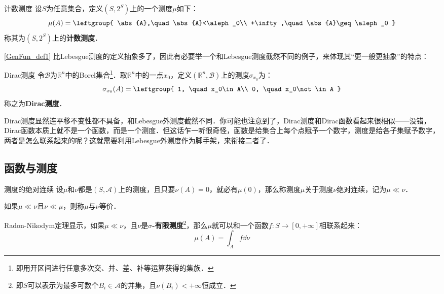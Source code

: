 \begin{example}{计数测度}
设$S$为任意集合，定义$(S, 2^S)$上的一个测度$\mu$如下：
\begin{equation}
\mu(A)=
\leftgroup{
    \abs{A},\quad \abs{A}<\aleph_0\\
    +\infty,\quad \abs{A}\geq\aleph_0
}
\end{equation}
称其为$(S, 2^S)$上的\textbf{计数测度}．
\end{example}

\autoref{GenFun_def1} 比Lebesgue测度的定义抽象多了，因此有必要举一个和Lebesgue测度截然不同的例子，来体现其“更一般更抽象”的特点：

\begin{example}{Dirac测度}
令$\mathcal{B}$为$\mathbb{R}^n$中的Borel集合\footnote{即用开区间进行任意多次交、并、差、补等运算获得的集族．}．取$\mathbb{R}^n$中的一点$x_0$，定义$(\mathbb{R}^n, \mathcal{B})$上的测度$\sigma_{x_0}$为：
\begin{equation}
\sigma_{x_0}(A)=\leftgroup{
    1, \quad x_0\in A\\
    0, \quad x_0\not\in A
}
\end{equation}
称之为\textbf{Dirac测度}．
\end{example}

Dirac测度显然连平移不变性都不具备，和Lebesgue外测度截然不同．你可能也注意到了，Dirac测度和Dirac函数看起来很相似——没错，Dirac函数本质上就不是一个函数，而是一个测度．但这话乍一听很奇怪，函数是给集合上每个点赋予一个数字，测度是给各子集赋予数字，两者是怎么联系起来的呢？这就需要利用Lebesgue外测度作为脚手架，来衔接二者了．





\subsection{函数与测度}




\begin{definition}{测度的绝对连续}
设$\mu$和$\nu$都是$(S, \mathcal{A})$上的测度，且只要$\nu(A)=0$，就必有$\mu(0)$，那么称测度$\mu$关于测度$\nu$绝对连续，记为$\mu\ll\nu$．

如果$\mu\ll\nu$且$\nu\ll\mu$，则称$\mu$与$\nu$等价．
\end{definition}



Radon-Nikodym定理显示，如果$\mu\ll\nu$，且$\nu$是$\sigma$\textbf{-有限测度}\footnote{即$S$可以表示为最多可数个$B_i\in\mathcal{A}$的并集，且$\nu(B_i)<+\infty$恒成立．}，那么$\mu$就可以和一个函数$f:S\to [0, +\infty]$相联系起来：
\begin{equation}
\mu(A) = \int_A f \dd \nu
\end{equation}

